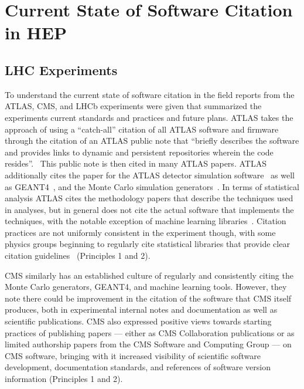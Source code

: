 \section{Current State of Software Citation in HEP}\label{sec:current_state}

\subsection{LHC Experiments}\label{sec:lhc_experiments}

To understand the current state of software citation in the field reports from the ATLAS, CMS, and LHCb experiments were given that summarized the experiments current standards and practices and future plans.
ATLAS takes the approach of using a ``catch-all'' citation of all ATLAS software and firmware through the citation of an ATLAS public note that ``briefly describes the software and provides links to dynamic and persistent repositories wherein the code resides''.~\cite{ATL-SOFT-PUB-2021-001}
This public note is then cited in many ATLAS papers.
ATLAS additionally cites the paper for the ATLAS detector simulation software~\cite{SOFT-2010-01} as well as GEANT4~\cite{GEANT4:2002zbu}, and the Monte Carlo simulation generators~\cite{Sjostrand:2007gs,Sjostrand:2014zea,Alwall:2014hca,Sherpa:2019gpd}.
In terms of statistical analysis ATLAS cites the methodology papers that describe the techniques used in analyses, but in general does not cite the actual software that implements the techniques, with the notable exception of machine learning libraries~\cite{chollet2015keras,tensorflow2015-whitepaper}.
Citation practices are not uniformly consistent in the experiment though, with some physics groups beginning to regularly cite statistical libraries that provide clear citation guidelines~\cite{pyhf,pyhf_joss} (Principles 1 and 2).

CMS similarly has an established culture of regularly and consistently citing the Monte Carlo generators, GEANT4, and machine learning tools.
However, they note there could be improvement in the citation of the software that CMS itself produces, both in experimental internal notes and documentation as well as scientific publications.
CMS also expressed positive views towards starting practices of publishing papers --- either as CMS Collaboration publications or as limited authorship papers from the CMS Software and Computing Group --- on CMS software, bringing with it increased visibility of scientific software development, documentation standards, and references of software version information (Principles 1 and 2).

